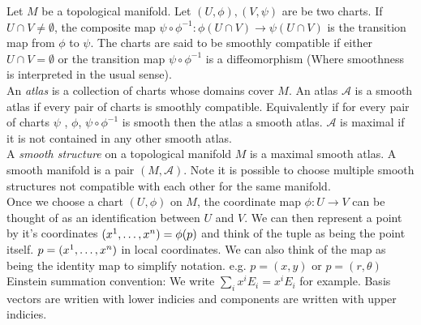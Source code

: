 \documentclass[14pt, twocolumn]{article}
\begin{document}
	Let $M$ be a topological manifold. Let $(U,\phi), (V,\psi)$ are be two charts. If $U \cap V \neq \emptyset$, the composite map $\psi \circ \phi^{-1} : \phi(U \cap V) \to \psi(U \cap V)$ is the transition map from $\phi$ to $\psi$. The charts are said to be smoothly compatible if either $U \cap V = \emptyset$ or the transition map $\psi \circ \phi^{-1}$ is a diffeomorphism (Where smoothness is interpreted in the usual sense).\\

	An \textit{atlas} is a collection of charts whose domains cover $M$. An atlas $\mathcal{A}$ is a smooth atlas if every pair of charts is smoothly compatible. Equivalently if for every pair of charts $\psi$ , $\phi$, $\psi \circ \phi^{-1}$ is smooth then the atlas a smooth atlas. $\mathcal{A}$ is maximal if it is not contained in any other smooth atlas.\\

	A \textit{smooth structure} on a topological manifold $M$ is a maximal smooth atlas. A smooth manifold is a pair $(M,\mathcal{A})$. Note it is possible to choose multiple smooth structures not compatible with each other for the same manifold.\\

	Once we choose a chart $(U,\phi)$ on $M$, the coordinate map $\phi : U \to V$ can be thought of as an identification between  $U$ and $V$. We can then represent a point by it's coordinates $(x^1 ,\mathellipsis , x^n) = \phi(p)$ and think of the tuple as being the point itself. $p = (x^1 ,\mathellipsis , x^n)$ in local coordinates. We can also think of the map as being the identity map to simplify notation. e.g. $p = (x,y)$ or $p = (r,\theta)$ \\

	Einstein summation convention:
	We write $\sum_i x^i E_i = x^iE_i$ for example. Basis vectors are writien with lower indicies and components are written with upper indicies.\\
\end{document}
